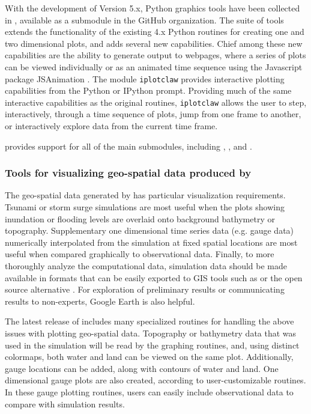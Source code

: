 With the development of \cpack Version 5.x, Python graphics tools
have been collected in \vclaw, available as a submodule in the
\cpack GitHub organization.  The \vclaw suite of tools extends the
functionality of the existing 4.x Python routines for creating one and
two dimensional plots, and adds several new capabilities.  Chief among
these new capabilities are the ability to generate output to webpages,
where a series of plots can be viewed individually or as an animated
time sequence using the Javascript package {\sc JSAnimation}
\cite{jsanimation}.
The \vclaw module {\tt iplotclaw} provides
interactive plotting capabilities from the Python or IPython prompt.
Providing much of the same interactive capabilities as the original
\mlab routines, {\tt iplotclaw} allows the user to step,
interactively, through a time sequence of plots, jump from one frame
to another, or interactively explore data from the current time frame.

\vclaw provides support for all of the main \cpack submodules, including
\cclaw, \aclaw, \pclaw and \gclaw.

\subsubsection{Tools for visualizing geo-spatial data produced by \gclaw}
The geo-spatial data generated by \gclaw has particular visualization
requirements.  Tsunami or storm surge simulations are most useful when
the plots showing inundation or flooding levels are overlaid onto
background bathymetry or topography.  Supplementary one dimensional
time series data (e.g. gauge data) numerically interpolated from
the simulation at fixed spatial locations are most useful when
compared graphically to observational data.  Finally, to more
thoroughly analyze the computational data, simulation data
should be made available in formats that can be easily exported to GIS tools
such as \agis or the open source alternative \qgis
\cite{arcgis,qgis}.  For exploration of preliminary results or
communicating results to non-experts, Google
Earth is also helpful.

The latest release of \cpack includes many specialized \vclaw routines
for handling the above issues with plotting geo-spatial data.
Topography or bathymetry data that was
used in the simulation will be read by the graphing routines, and,
using distinct colormaps, both water and land can be viewed on the
same plot.   Additionally, gauge locations can be added, along with contours
of water and land.  One dimensional gauge plots are also created, according to
user-customizable routines. In these gauge plotting routines,
users can easily include  observational data to compare with \gclaw
simulation results.

